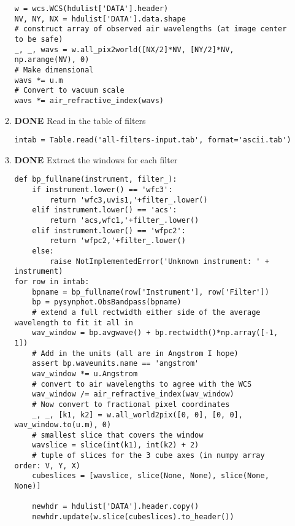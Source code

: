 \documentclass[11pt]{article}
\begin{document}
\begin{enumerate}
\begin{enumerate}
\begin{verbatim}
w = wcs.WCS(hdulist['DATA'].header)
NV, NY, NX = hdulist['DATA'].data.shape
# construct array of observed air wavelengths (at image center to be safe)
_, _, wavs = w.all_pix2world([NX/2]*NV, [NY/2]*NV, np.arange(NV), 0) 
# Make dimensional
wavs *= u.m
# Convert to vacuum scale
wavs *= air_refractive_index(wavs)
\end{verbatim}
\item {\bfseries\sffamily DONE} Read in the table of filters
\label{sec:orgheadline25}
\begin{verbatim}
intab = Table.read('all-filters-input.tab', format='ascii.tab')
\end{verbatim}
\item {\bfseries\sffamily DONE} Extract the windows for each filter
\label{sec:orgheadline26}
\begin{verbatim}
def bp_fullname(instrument, filter_):
    if instrument.lower() == 'wfc3':
        return 'wfc3,uvis1,'+filter_.lower()
    elif instrument.lower() == 'acs':
        return 'acs,wfc1,'+filter_.lower()
    elif instrument.lower() == 'wfpc2':
        return 'wfpc2,'+filter_.lower()
    else:
        raise NotImplementedError('Unknown instrument: ' + instrument)
for row in intab:
    bpname = bp_fullname(row['Instrument'], row['Filter'])
    bp = pysynphot.ObsBandpass(bpname)
    # extend a full rectwidth either side of the average wavelength to fit it all in
    wav_window = bp.avgwave() + bp.rectwidth()*np.array([-1, 1])
    # Add in the units (all are in Angstrom I hope)
    assert bp.waveunits.name == 'angstrom'
    wav_window *= u.Angstrom
    # convert to air wavelengths to agree with the WCS
    wav_window /= air_refractive_index(wav_window)
    # Now convert to fractional pixel coordinates
    _, _, [k1, k2] = w.all_world2pix([0, 0], [0, 0], wav_window.to(u.m), 0)
    # smallest slice that covers the window
    wavslice = slice(int(k1), int(k2) + 2)
    # tuple of slices for the 3 cube axes (in numpy array order: V, Y, X)
    cubeslices = [wavslice, slice(None, None), slice(None, None)]

    newhdr = hdulist['DATA'].header.copy()
    newhdr.update(w.slice(cubeslices).to_header())


\end{verbatim}
\end{enumerate}
\end{enumerate}
\end{document}
